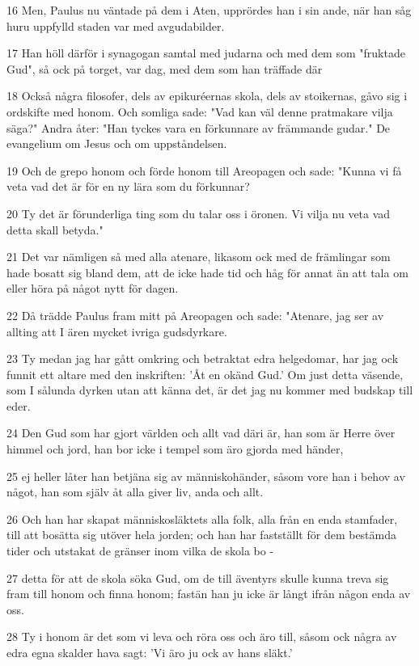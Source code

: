 \par 16 Men, Paulus nu väntade på dem i Aten, upprördes han i sin ande, när han såg huru uppfylld staden var med avgudabilder.
\par 17 Han höll därför i synagogan samtal med judarna och med dem som "fruktade Gud", så ock på torget, var dag, med dem som han träffade där
\par 18 Också några filosofer, dels av epikuréernas skola, dels av stoikernas, gåvo sig i ordskifte med honom. Och somliga sade: "Vad kan väl denne pratmakare vilja säga?" Andra åter: "Han tyckes vara en förkunnare av främmande gudar." De evangelium om Jesus och om uppståndelsen.
\par 19 Och de grepo honom och förde honom till Areopagen och sade: "Kunna vi få veta vad det är för en ny lära som du förkunnar?
\par 20 Ty det är förunderliga ting som du talar oss i öronen. Vi vilja nu veta vad detta skall betyda."
\par 21 Det var nämligen så med alla atenare, likasom ock med de främlingar som hade bosatt sig bland dem, att de icke hade tid och håg för annat än att tala om eller höra på något nytt för dagen.
\par 22 Då trädde Paulus fram mitt på Areopagen och sade: "Atenare, jag ser av allting att I ären mycket ivriga gudsdyrkare.
\par 23 Ty medan jag har gått omkring och betraktat edra helgedomar, har jag ock funnit ett altare med den inskriften: 'Åt en okänd Gud.' Om just detta väsende, som I sålunda dyrken utan att känna det, är det jag nu kommer med budskap till eder.
\par 24 Den Gud som har gjort världen och allt vad däri är, han som är Herre över himmel och jord, han bor icke i tempel som äro gjorda med händer,
\par 25 ej heller låter han betjäna sig av människohänder, såsom vore han i behov av något, han som själv åt alla giver liv, anda och allt.
\par 26 Och han har skapat människosläktets alla folk, alla från en enda stamfader, till att bosätta sig utöver hela jorden; och han har fastställt för dem bestämda tider och utstakat de gränser inom vilka de skola bo -
\par 27 detta för att de skola söka Gud, om de till äventyrs skulle kunna treva sig fram till honom och finna honom; fastän han ju icke är långt ifrån någon enda av oss.
\par 28 Ty i honom är det som vi leva och röra oss och äro till, såsom ock några av edra egna skalder hava sagt: 'Vi äro ju ock av hans släkt.'
